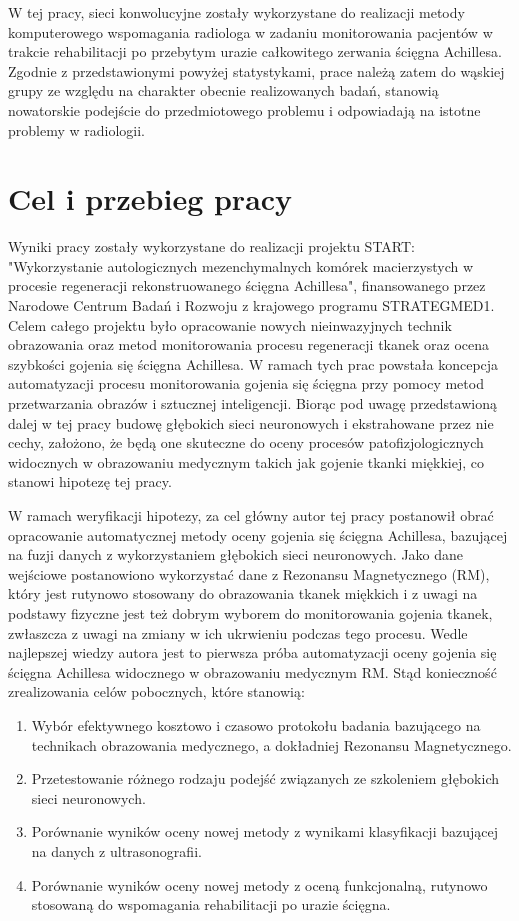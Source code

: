 W tej pracy, sieci konwolucyjne zostały wykorzystane do realizacji metody komputerowego wspomagania radiologa w zadaniu monitorowania pacjentów w trakcie rehabilitacji po przebytym urazie całkowitego zerwania ścięgna Achillesa. Zgodnie z przedstawionymi powyżej statystykami, prace należą zatem do wąskiej grupy ze względu na charakter obecnie realizowanych badań, stanowią nowatorskie podejście do przedmiotowego problemu i odpowiadają na istotne problemy w radiologii.


\chapter{Cel i przebieg pracy}

Wyniki pracy zostały wykorzystane do realizacji projektu START: "Wykorzystanie autologicznych mezenchymalnych komórek macierzystych w procesie regeneracji rekonstruowanego ścięgna Achillesa", finansowanego przez Narodowe Centrum Badań i Rozwoju z krajowego programu STRATEGMED1. Celem całego projektu było opracowanie nowych nieinwazyjnych technik obrazowania oraz metod monitorowania procesu regeneracji tkanek oraz ocena szybkości gojenia się ścięgna Achillesa. W ramach tych prac powstała koncepcja automatyzacji procesu monitorowania gojenia się ścięgna przy pomocy metod przetwarzania obrazów i sztucznej inteligencji. Biorąc pod uwagę przedstawioną dalej w tej pracy budowę głębokich sieci neuronowych i ekstrahowane przez nie cechy, założono, że będą one skuteczne do oceny procesów patofizjologicznych widocznych w obrazowaniu medycznym takich jak gojenie tkanki miękkiej, co stanowi hipotezę tej pracy.

W ramach weryfikacji hipotezy, za cel główny autor tej pracy postanowił obrać opracowanie automatycznej metody oceny gojenia się ścięgna Achillesa, bazującej na fuzji danych z wykorzystaniem głębokich sieci neuronowych. Jako dane wejściowe postanowiono wykorzystać dane z Rezonansu Magnetycznego (RM), który jest rutynowo stosowany do obrazowania tkanek miękkich i z uwagi na podstawy fizyczne jest też dobrym wyborem do monitorowania gojenia tkanek, zwłaszcza z uwagi na zmiany w ich ukrwieniu podczas tego procesu. Wedle najlepszej wiedzy autora jest to pierwsza próba automatyzacji oceny gojenia się ścięgna Achillesa widocznego w obrazowaniu medycznym RM. Stąd konieczność zrealizowania celów pobocznych, które stanowią:
\begin{enumerate}
	\item Wybór efektywnego kosztowo i czasowo protokołu badania bazującego na technikach obrazowania medycznego, a dokładniej Rezonansu Magnetycznego.
	\item Przetestowanie różnego rodzaju podejść związanych ze szkoleniem głębokich sieci neuronowych.
	\item Porównanie wyników oceny nowej metody z wynikami klasyfikacji bazującej na danych z ultrasonografii.
	\item Porównanie wyników oceny nowej metody z oceną funkcjonalną, rutynowo stosowaną do wspomagania rehabilitacji po urazie ścięgna.
\end{enumerate}

